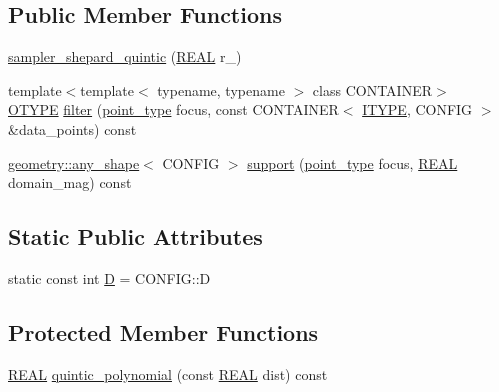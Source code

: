 \subsection*{Public Member Functions}
\begin{DoxyCompactItemize}
\item 
\hyperlink{classmui_1_1sampler__shepard__quintic_a6cf881d7f4900fd07287c1b8c9392834}{sampler\+\_\+shepard\+\_\+quintic} (\hyperlink{classmui_1_1sampler__shepard__quintic_ae674072eac8556d3520cf5f6c1eb7ae6}{R\+E\+AL} r\+\_\+)
\item 
{\footnotesize template$<$template$<$ typename, typename $>$ class C\+O\+N\+T\+A\+I\+N\+ER$>$ }\\\hyperlink{classmui_1_1sampler__shepard__quintic_ae71df3379dbdc49abd163d49eb310411}{O\+T\+Y\+PE} \hyperlink{classmui_1_1sampler__shepard__quintic_ab0dcfc9f150013f4fb81a8cc4e0a3d70}{filter} (\hyperlink{classmui_1_1sampler__shepard__quintic_ac80518ba9645191b9d6e2fbee760e031}{point\+\_\+type} focus, const C\+O\+N\+T\+A\+I\+N\+ER$<$ \hyperlink{classmui_1_1sampler__shepard__quintic_a449ad1b058df2448a50dab7822626fa6}{I\+T\+Y\+PE}, C\+O\+N\+F\+IG $>$ \&data\+\_\+points) const
\item 
\hyperlink{classmui_1_1geometry_1_1any__shape}{geometry\+::any\+\_\+shape}$<$ C\+O\+N\+F\+IG $>$ \hyperlink{classmui_1_1sampler__shepard__quintic_a61d9b8c4933a910d14e6c61852019123}{support} (\hyperlink{classmui_1_1sampler__shepard__quintic_ac80518ba9645191b9d6e2fbee760e031}{point\+\_\+type} focus, \hyperlink{classmui_1_1sampler__shepard__quintic_ae674072eac8556d3520cf5f6c1eb7ae6}{R\+E\+AL} domain\+\_\+mag) const
\end{DoxyCompactItemize}
\subsection*{Static Public Attributes}
\begin{DoxyCompactItemize}
\item 
static const int \hyperlink{classmui_1_1sampler__shepard__quintic_a60c5da2ab6505a9491843a3018c5bdc7}{D} = C\+O\+N\+F\+I\+G\+::D
\end{DoxyCompactItemize}
\subsection*{Protected Member Functions}
\begin{DoxyCompactItemize}
\item 
\hyperlink{classmui_1_1sampler__shepard__quintic_ae674072eac8556d3520cf5f6c1eb7ae6}{R\+E\+AL} \hyperlink{classmui_1_1sampler__shepard__quintic_a6b8885e07ba9265713d5a6256c1851e5}{quintic\+\_\+polynomial} (const \hyperlink{classmui_1_1sampler__shepard__quintic_ae674072eac8556d3520cf5f6c1eb7ae6}{R\+E\+AL} dist) const
\end{DoxyCompactItemize}

